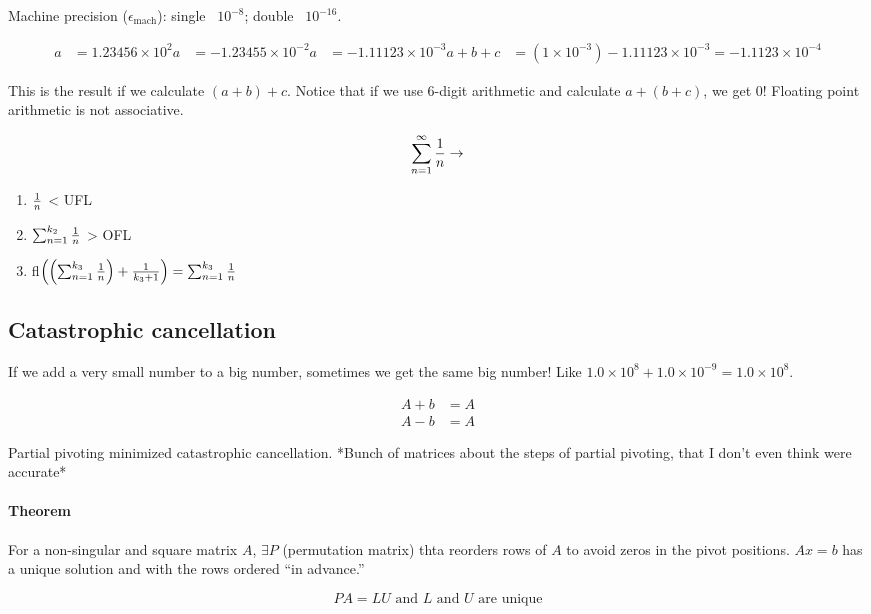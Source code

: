 Machine precision ($\epsilon_{\text{mach}}$): single ~$10^{-8}$; double ~$10^{-16}$.

\begin{align*}
  a &= 1.23456 \times 10^2
  a &= -1.23455 \times 10^{-2}
  a &= -1.11123 \times 10^{-3}
  a+b+c &= (1 \times 10^{-3}) -1.11123 \times 10^{-3} = -1.1123 \times 10^{-4}
\end{align*}

This is the result if we calculate $(a+b) + c$. Notice that if we use 6-digit arithmetic and calculate $a+(b+c)$, we get 0! Floating point arithmetic is not associative.

\[
  \sum_{n=1}^\infty {1 \over n} \to
\]

\begin{enumerate}
  \item ${1 \over n}$ < UFL
  \item $\sum_{n=1}^{k_2} {1 \over n}$ > OFL
  \item fl$\left(\left(\sum_{n=1}^{k_3} {1 \over n}\right) + {1 \over k_3 + 1} \right) = \sum_{n=1}^{k_3} {1 \over n}$
\end{enumerate}

\subsection{Catastrophic cancellation}

If we add a very small number to a big number, sometimes we get the same big number! Like $1.0 \times 10^8 + 1.0 \times 10^{-9} = 1.0 \times 10^8$.

\begin{align*}
  A + b &= A \\
  A - b &= A
\end{align*}

Partial pivoting minimized catastrophic cancellation. *Bunch of matrices about the steps of partial pivoting, that I don't even think were accurate*

\paragraph{Theorem} For a non-singular and square matrix $A$, $\exists P$ (permutation matrix) thta reorders rows of $A$ to avoid zeros in the pivot positions. $Ax=b$ has a unique solution and with the rows ordered ``in advance.''

\[
  PA = LU \text{ and } L \text{ and } U \text{ are unique}
\]
